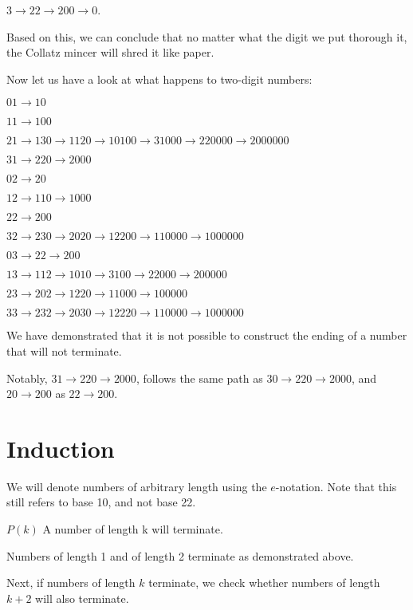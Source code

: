 \documentclass[10pt,a4paper,showpacs,nofootinbib,aps,superscriptaddress,eqsecnum,prd,showkeys,notitlepage]{article}
\begin{document}
$3 \rightarrow 22 \rightarrow 200 \rightarrow 0$.

Based on this, we can conclude that no matter what the digit we put thorough it, the Collatz mincer will shred it like paper.

Now let us have a look at what happens to two-digit numbers:

$01 \rightarrow 10$

$11 \rightarrow 100$

$21 \rightarrow 130 \rightarrow 1120 \rightarrow 10100 \rightarrow 31000 \rightarrow 220000 \rightarrow 2000000$

$31 \rightarrow 220 \rightarrow 2000$

$02 \rightarrow 20$

$12 \rightarrow 110 \rightarrow 1000$

$22 \rightarrow 200$

$32 \rightarrow 230 \rightarrow 2020 \rightarrow 12200 \rightarrow 110000 \rightarrow 1000000$

$03 \rightarrow 22 \rightarrow 200$

$13 \rightarrow 112 \rightarrow 1010 \rightarrow 3100 \rightarrow 22000 \rightarrow 200000$

$23 \rightarrow 202 \rightarrow 1220 \rightarrow 11000 \rightarrow 100000$

$33 \rightarrow 232 \rightarrow 2030 \rightarrow 12220 \rightarrow 110000 \rightarrow 1000000$

We have demonstrated that it is not possible to construct the ending of a number that will not terminate.

Notably, $31 \rightarrow 220 \rightarrow 2000$, follows the same path as $30 \rightarrow 220 \rightarrow 2000$, and $20 \rightarrow 200$ as $22 \rightarrow 200$.

\addtocounter{section}{6}


\section{Induction}

We will denote numbers of arbitrary length using the $e$-notation. Note that this still refers to base 10, and not base 22.

$P(k)$ A number of length k will terminate.

Numbers of length 1 and of length 2 terminate as demonstrated above.

Next, if numbers of length $k$ terminate, we check whether numbers of length $k+2$ will also terminate.
\end{document}
